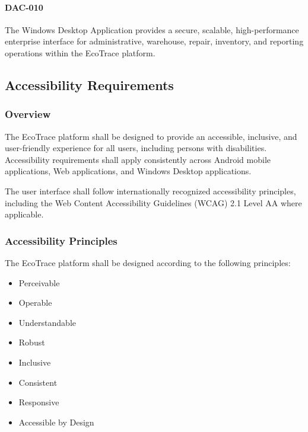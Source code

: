 \paragraph{DAC-010}

The Windows Desktop Application provides a secure, scalable,
high-performance enterprise interface for administrative, warehouse,
repair, inventory, and reporting operations within the EcoTrace
platform.

\subsection{Accessibility Requirements}


\subsubsection*{Overview}

The EcoTrace platform shall be designed to provide an accessible,
inclusive, and user-friendly experience for all users, including persons
with disabilities. Accessibility requirements shall apply consistently
across Android mobile applications, Web applications, and Windows
Desktop applications.

The user interface shall follow internationally recognized accessibility
principles, including the Web Content Accessibility Guidelines (WCAG)
2.1 Level AA where applicable.


\subsubsection*{Accessibility Principles}

The EcoTrace platform shall be designed according to the following
principles:

\begin{itemize}

\item Perceivable

\item Operable

\item Understandable

\item Robust

\item Inclusive

\item Consistent

\item Responsive

\item Accessible by Design

\end{itemize}

